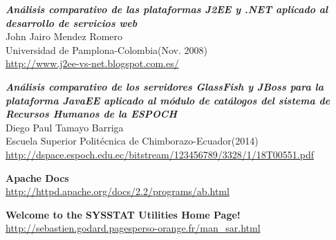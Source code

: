 \documentclass[a4paper, 10pt]{article}
\begin{document}
\begin{thebibliography}{10}
	\textbf{\textit{Análisis comparativo de las plataformas J2EE y .NET aplicado
	al desarrollo de servicios web}}\\
	John Jairo Mendez Romero\\
	Universidad de Pamplona-Colombia(Nov. 2008)\\
		\url{http://www.j2ee-vs-net.blogspot.com.es/}
	
	\textbf{\textit{Análisis comparativo de los servidores GlassFish y JBoss para
	la plataforma JavaEE aplicado al módulo de catálogos del sistema de Recursos
	Humanos de la ESPOCH}}\\
	Diego Paul Tamayo Barriga\\
	Escuela Superior Politécnica de Chimborazo-Ecuador(2014)\\
		\url{http://dspace.espoch.edu.ec/bitstream/123456789/3328/1/18T00551.pdf}

	\textbf{Apache Docs}\\
		\url{http://httpd.apache.org/docs/2.2/programs/ab.html}
	
	
	\textbf{Welcome to the SYSSTAT Utilities Home Page!}\\
		\url{http://sebastien.godard.pagesperso-orange.fr/man_sar.html}
\end{thebibliography}
\end{document}
